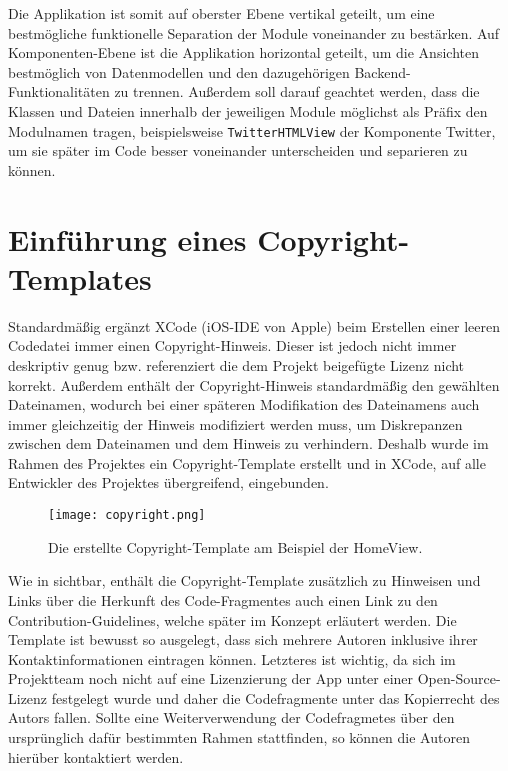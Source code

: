 Die Applikation ist somit auf oberster Ebene vertikal geteilt, um eine bestmögliche funktionelle Separation der Module voneinander zu bestärken. Auf Komponenten-Ebene ist die Applikation horizontal geteilt, um die Ansichten bestmöglich von Datenmodellen und den dazugehörigen Backend-Funktionalitäten zu trennen. Außerdem soll darauf geachtet werden, dass die Klassen und Dateien innerhalb der jeweiligen Module möglichst als Präfix den Modulnamen tragen, beispielsweise \texttt{TwitterHTMLView} der Komponente Twitter, um sie später im Code besser voneinander unterscheiden und separieren zu können.

\section{Einführung eines Copyright-Templates}

Standardmäßig ergänzt XCode (iOS-IDE von Apple) beim Erstellen einer leeren Codedatei immer einen Copyright-Hinweis. Dieser ist jedoch nicht immer deskriptiv genug bzw. referenziert die dem Projekt beigefügte Lizenz nicht korrekt. Außerdem enthält der Copyright-Hinweis standardmäßig den gewählten Dateinamen, wodurch bei einer späteren Modifikation des Dateinamens auch immer gleichzeitig der Hinweis modifiziert werden muss, um Diskrepanzen zwischen dem Dateinamen und dem Hinweis zu verhindern. Deshalb wurde im Rahmen des Projektes ein Copyright-Template erstellt und in XCode, auf alle Entwickler des Projektes übergreifend, eingebunden.

\begin{figure}[H]
\texttt{[image: copyright.png]}
\caption{Die erstellte Copyright-Template am Beispiel der HomeView.}\label{fig:copyright}
\end{figure}

Wie in  sichtbar, enthält die Copyright-Template zusätzlich zu Hinweisen und Links über die Herkunft des Code-Fragmentes auch einen Link zu den Contribution-Guidelines, welche später im Konzept erläutert werden. Die Template ist bewusst so ausgelegt, dass sich mehrere Autoren inklusive ihrer Kontaktinformationen eintragen können. Letzteres ist wichtig, da sich im Projektteam noch nicht auf eine Lizenzierung der App unter einer Open-Source-Lizenz festgelegt wurde und daher die Codefragmente unter das Kopierrecht des Autors fallen. Sollte eine Weiterverwendung der Codefragmetes über den ursprünglich dafür bestimmten Rahmen stattfinden, so können die Autoren hierüber kontaktiert werden.

